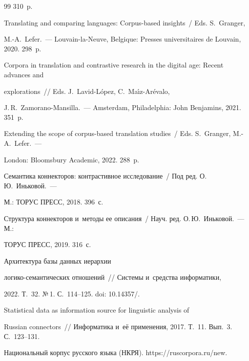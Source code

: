 {{\begin{thebibliography}{99}
310~p.




Translating and comparing languages: Corpus-based insights~/ Eds. S.~Granger, 


 \mbox{M.-A.}~Lefer.~--- Louvain-la-Neuve, Belgique: Presses universitaires de Louvain, 2020. 298~p.




Corpora in translation and contrastive research in the digital age: Recent advances and 


explorations~/\!\!/ Eds. J.~Lavid-L\'{o}pez, C.~Ma\'{\i}z-Ar\'{e}valo,  


J.\,R.~Zamorano-Mansilla.~--- Amsterdam, Philadelphia: John Benjamins, 2021. 351~p.




Extending the scope of corpus-based translation studies~/ Eds. S.~Granger, \mbox{M.-A.}~Lefer.~--- 


London: Bloomsbury Academic, 2022. 288~p.




Семантика коннекторов: контрастивное исследование~/ Под ред. О.\,Ю.~Иньковой.~--- 


М.: ТОРУС ПРЕСС, 2018. 396~с.




Структура коннекторов и~методы ее описания~/ Науч. ред. О.\,Ю.~Иньковой.~--- М.: 


ТОРУС ПРЕСС, 2019. 316~с.







 Архитектура базы данных иерархии  


ло\-ги\-ко-се\-ман\-ти\-че\-ских отношений~/\!\!/ Сис\-те\-мы и~средства информатики, 


2022. Т.~32. №\,1. С.~114--125. doi: 10.14357\!/.







 Statistical data as information source for linguistic analysis of 


Russian connectors~/\!\!/ Информатика и~её применения, 2017. Т.~11. Вып.~3. С.~123--131.




Национальный корпус русского языка (НКРЯ). {\sf https://ruscorpora.ru/new.}









\end{thebibliography}}}
